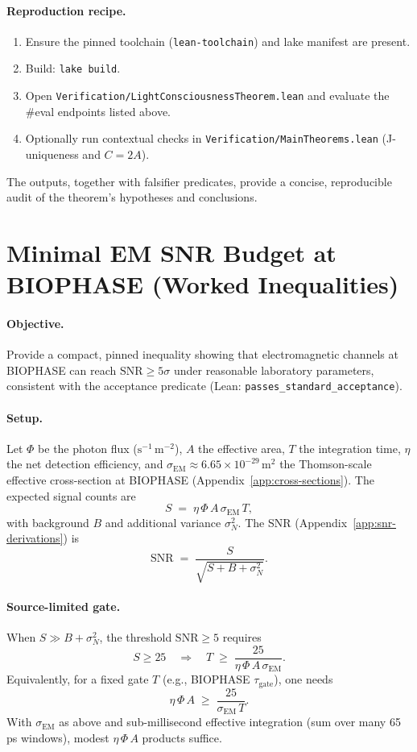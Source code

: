 \documentclass[12pt,a4paper]{article}
\begin{document}
\paragraph{Reproduction recipe.}
\begin{enumerate}
  \item Ensure the pinned toolchain (\texttt{lean-toolchain}) and lake manifest are present.
  \item Build: \texttt{lake build}.
  \item Open \texttt{Verification/LightConsciousnessTheorem.lean} and evaluate the \#eval endpoints listed above.
  \item Optionally run contextual checks in \texttt{Verification/MainTheorems.lean} (J-uniqueness and \(C{=}2A\)).
\end{enumerate}
The outputs, together with falsifier predicates, provide a concise, reproducible audit of the theorem's hypotheses and conclusions.

\section{Minimal EM SNR Budget at BIOPHASE (Worked Inequalities)}
\label{app:min-snr-budget}

\paragraph{Objective.}
Provide a compact, pinned inequality showing that electromagnetic channels at BIOPHASE can reach \(\mathrm{SNR}\ge 5\sigma\) under reasonable laboratory parameters, consistent with the acceptance predicate (Lean: \texttt{passes\_standard\_acceptance}).

\paragraph{Setup.}
Let \(\Phi\) be the photon flux (\(\mathrm{s}^{-1}\,\mathrm{m}^{-2}\)), \(A\) the effective area, \(T\) the integration time, \(\eta\) the net detection efficiency, and \(\sigma_{\mathrm{EM}}\approx 6.65\times 10^{-29}\,\mathrm{m}^{2}\) the Thomson-scale effective cross-section at BIOPHASE (Appendix~\ref{app:cross-sections}). The expected signal counts are
\[
  S \;=\; \eta\,\Phi\,A\,\sigma_{\mathrm{EM}}\,T,
\]
with background \(B\) and additional variance \(\sigma_N^2\). The SNR (Appendix~\ref{app:snr-derivations}) is
\[
  \mathrm{SNR} \;=\; \frac{S}{\sqrt{S+B+\sigma_N^2}}.
\]

\paragraph{Source-limited gate.}
When \(S\gg B+\sigma_N^2\), the threshold \(\mathrm{SNR}\ge 5\) requires
\[
  S\ge 25
  \quad\Rightarrow\quad
  T \;\ge\; \frac{25}{\eta\,\Phi\,A\,\sigma_{\mathrm{EM}}}.
\]
Equivalently, for a fixed gate \(T\) (e.g., BIOPHASE \(\tau_\mathrm{gate}\)), one needs
\[
  \eta\,\Phi\,A \;\ge\; \frac{25}{\sigma_{\mathrm{EM}}\,T}.
\]
With \(\sigma_{\mathrm{EM}}\) as above and sub-millisecond effective integration (sum over many 65 ps windows), modest \(\eta\,\Phi\,A\) products suffice.
\end{document}
